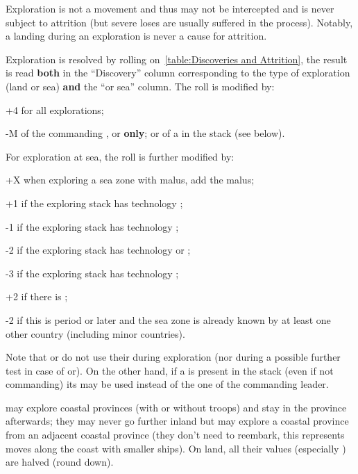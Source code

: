 Exploration is not a movement and thus may not be intercepted and is never
subject to attrition (but severe loses are usually suffered in the
process). Notably, a landing during an exploration is never a cause for
attrition.

Exploration is resolved by rolling on~\ref{table:Discoveries and Attrition},
the result is read \textbf{both} in the ``Discovery'' column corresponding to
the type of exploration (land or sea) \textbf{and} the ``\ROTW or sea''
column. The roll is modified by:
\begin{modlist}
\item[+4] for all explorations;
\item[-M] \Man of the commanding \LeaderE, \LeaderC or \LeaderGov
  \textbf{only}; or \Man of a \LeaderMis in the stack (see below).
\end{modlist}

For exploration at sea, the roll is further modified by:
\begin{modlist}
\item[+X] when exploring a sea zone with malus, add the malus;
\item[+1] if the exploring stack has technology \TCAR;
\item[-1] if the exploring stack has technology \TBAT;
\item[-2] if the exploring stack has technology \TVE or \TTD;
\item[-3] if the exploring stack has technology \TSF;
\item[+2] if there is ;
\item[-2] if this is period  or later and the sea zone is already
  known by at least one other country (including minor countries).
\end{modlist}

\newcommand{\myxxa}{\phantom{a}\xxa\xspace}
\newcommand{\myxxc}{\phantom{a}\xxc\xspace}

Note that \LeaderG or \LeaderA do not use their \Man during exploration (nor
during a possible further test in case of\myxxa or\myxxc). On the
other hand, if a \LeaderMis is present in the stack (even if not commanding)
its \Man may be used instead of the one of the commanding leader.

\LeaderE may explore coastal provinces (with or without troops) and stay in
the province afterwards; they may never go further inland but may explore a
coastal province from an adjacent coastal province (they don't need to
reembark, this represents moves along the coast with smaller ships). On land,
all their values (especially \Man) are halved (round down).

